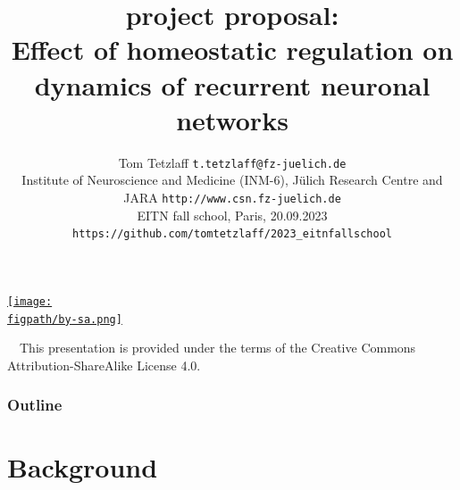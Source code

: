 \documentclass[8pt,t,usepdftitle=false]{beamer}
\title{%
  {\normalsize\normalfont project proposal:}\\[1ex]
  {\large\bf Effect of homeostatic regulation on dynamics of recurrent neuronal networks}\\[1ex]
}
\subtitle{%
  {\normalsize\mdseries Tom Tetzlaff}%
  {\hfill\tiny\texttt{t.tetzlaff@fz-juelich.de}}\\  
  {\footnotesize\mdseries Institute of Neuroscience and Medicine (INM-6), J\"ulich Research Centre and JARA}
  {\hfill\tiny\texttt{http://www.csn.fz-juelich.de}}
  \\
  {\tiny\mdseries EITN fall school, Paris, 20.09.2023}
  {\hfill\tiny\texttt{https://github.com/tomtetzlaff/2023\_eitnfallschool}}  
}
\date{}
\author{}
\institute{}
\def\figpath{./figures}
\begin{document}
\maketitle

\begin{frame}[plain]
  \begin{center}
    \parbox{0.9\linewidth}{
      \vspace{0.95\textheight}
      \parbox[c]{0.1\linewidth}{%
        \href{https://creativecommons.org/licenses/by-sa/4.0}{%
          \texttt{[image: \\figpath/by-sa.png]}}}
      \parbox[c]{0.9\linewidth}{\scriptsize%
        ~~{}This presentation is provided under the terms of the Creative Commons Attribution-ShareAlike License 4.0.
      }
    }    
  \end{center}
\end{frame}
\def\ttl{Outline}
\begin{frame}[plain]
  \frametitle{\ttl}
  \tableofcontents
\end{frame}
\def\ttl{Background}\section{\ttl}
\end{document}
